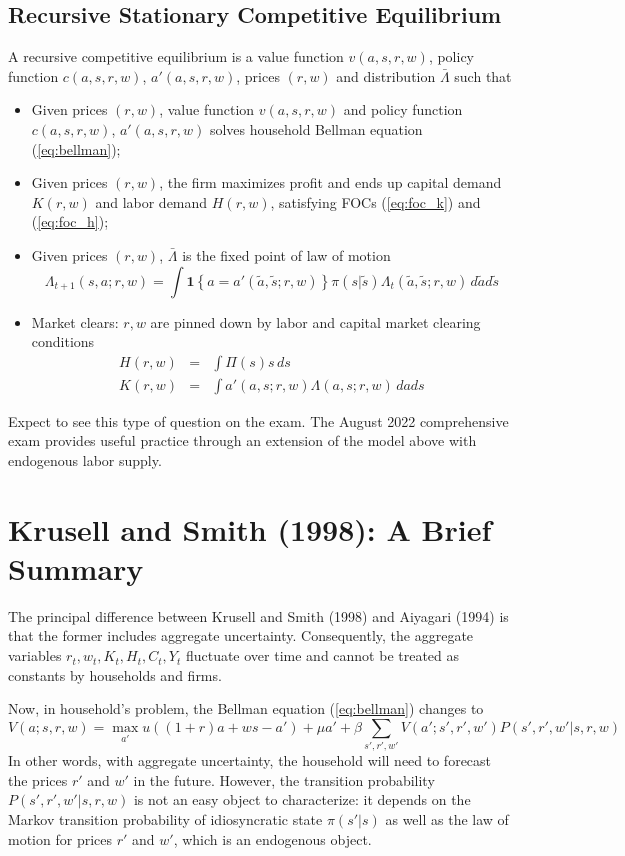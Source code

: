 \documentclass[12pt]{article}
\begin{document}
\subsection{Recursive Stationary Competitive Equilibrium}
A recursive competitive equilibrium is a value function $v(a,s,r,w)$, policy function $c(a,s,r,w)$, $a'(a,s,r,w)$, prices $(r,w)$ and distribution $\bar{\Lambda}$ such that
\begin{itemize}
	\item Given prices $(r,w)$, value function $v(a,s,r,w)$ and policy function $c(a,s,r,w)$, $a'(a,s,r,w)$ solves household Bellman equation (\ref{eq:bellman});
	\item Given prices $(r,w)$, the firm maximizes profit and ends up capital demand $K(r,w)$ and labor demand $H(r,w)$, satisfying FOCs (\ref{eq:foc_k}) and (\ref{eq:foc_h});
	\item Given prices $(r,w)$, $\bar{\Lambda}$ is the fixed point of law of motion
	\begin{equation}
		\Lambda_{t+1}(s,a;r,w) = \int \mathbf{1}\left\{a = a'(\tilde{a}, \tilde{s}; r,w)\right\} \pi(s|\tilde{s}) \Lambda_t(\tilde{a}, \tilde{s}; r,w)\, d\tilde{a} d\tilde{s}
	\end{equation}
	\item Market clears: $r, w$ are pinned down by labor and capital market clearing conditions
	\begin{eqnarray}
		H(r,w) &=& \int \Pi(s) s\,ds \\
		K(r,w) &=& \int a'(a,s; r,w) \Lambda(a,s; r,w) \,da ds
	\end{eqnarray}
\end{itemize}
Expect to see this type of question on the exam. The August 2022 comprehensive exam provides useful practice through an extension of the model above with endogenous labor supply.

\section{Krusell and Smith (1998): A Brief Summary}

The principal difference between Krusell and Smith (1998) and Aiyagari (1994) is that the former includes aggregate uncertainty. Consequently, the aggregate variables $r_t, w_t, K_t, H_t, C_t, Y_t$ fluctuate over time and cannot be treated as constants by households and firms. 

Now, in household's problem, the Bellman equation (\ref{eq:bellman}) changes to
\begin{equation}
	V(a;s, r, w) = \max_{a'} u\left((1+r) a + ws - a'\right) + \mu a' + \beta \sum_{s', r', w'}V(a';s', r', w') P(s',r', w'|s,r,w)
\end{equation}
In other words, with aggregate uncertainty, the household will need to forecast the prices $r'$ and $w'$ in the future. However, the transition probability $P(s',r',w'|s,r,w)$ is not an easy object to characterize: it depends on the Markov transition probability of idiosyncratic state $\pi(s'|s)$ as well as the law of motion for prices $r'$ and $w'$, which is an endogenous object.
\end{document}
